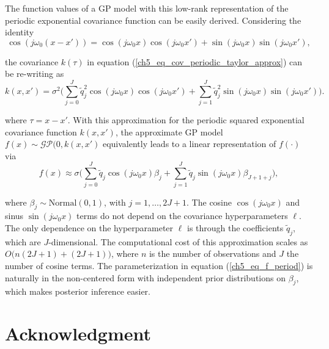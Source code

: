 \documentclass[onecolumn,a4paper,11pt]{article}
\begin{document}
The function values of a GP model with this low-rank representation of the periodic exponential covariance function can be easily derived. Considering the identity
%
\begin{equation*}
\cos(j\omega_0 (x-x'))=\cos(j\omega_0 x) \cos(j\omega_0 x') + \sin(j\omega_0 x) \sin(j\omega_0 x'),
\end{equation*}

\noindent the covariance $k(\tau)$ in equation (\ref{ch5_eq_cov_periodic_taylor_approx}) can be re-writing as
%
\begin{equation} \label{ch5_eq_cov_periodic_taylor_approx_2}
k(x,x')= \sigma^2 \Big( \sum_{j=0}^{J} \tilde{q}_j^2 \cos(j\omega_0 x)  \cos(j\omega_0 x') + \sum_{j=1}^{J} \tilde{q}_j^2 \sin(j\omega_0 x) \sin(j\omega_0 x') \Big).
\end{equation}

\noindent where $\tau=x-x'$. With this approximation for the periodic squared exponential covariance function $k(x,x')$, the approximate GP model $f(x) \sim \mathcal{GP}(0,k(x,x')$ equivalently leads to a linear representation of $f(\cdot)$ via
%
\begin{equation} \label{ch5_eq_f_period}
f(x) \approx \sigma \Big( \sum_{j=0}^J  \tilde{q}_j \cos(j\omega_0 x) \beta_j +  \sum_{j=1}^J \tilde{q}_j \sin(j\omega_0 x) \beta_{J+1+j} \Big),
\end{equation}

\noindent where $\beta_j \sim \text{Normal}(0,1)$, with $j=1,\dots,2J+1$. The cosine $\cos(j\omega_0 x)$ and sinus $\sin(j\omega_0 x)$ terms do not depend on the covariance hyperparameters $\ell$. The only dependence on the hyperparameter $\ell$ is through the coefficients $\tilde{q}_j$, which are $J$-dimensional. The computational cost of this approximation scales as $O\big(n(2J+1) + (2J+1)\big)$, where $n$ is the number of observations and $J$ the number of cosine terms.
The parameterization in equation (\ref{ch5_eq_f_period}) is naturally in the non-centered form with independent prior distributions on
$\beta_j$, which makes posterior inference easier.



\section*{Acknowledgment}



\end{document}
